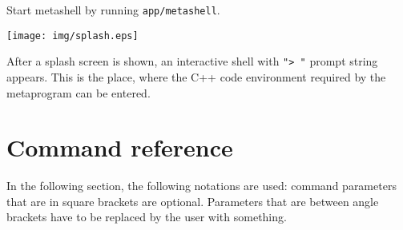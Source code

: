 Start metashell by running \verb$app/metashell$.

\texttt{[image: img/splash.eps]}

After a splash screen is shown, an interactive shell with \verb$"> "$
prompt string appears. This is the place, where the C++ code environment
required by the metaprogram can be entered.



\section{Command reference}

In the following section, the following notations are used: command parameters
that are in square brackets are optional. Parameters that are between angle
brackets have to be replaced by the user with something.



